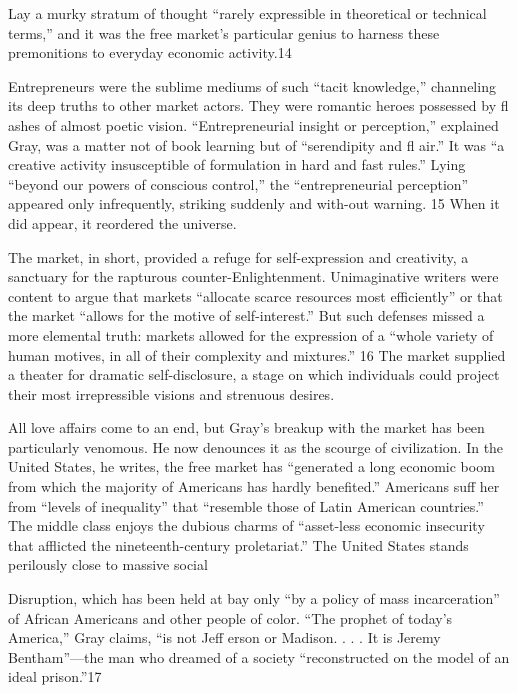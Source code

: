 Lay a murky stratum of thought “rarely expressible in theoretical or technical terms,” and it was the free market’s particular genius to harness these premonitions to everyday economic activity.{\color{blue}14}
 \par 
Entrepreneurs were the sublime mediums of such “tacit knowledge,” channeling its deep truths to other market actors. They were romantic heroes possessed by fl ashes of almost poetic vision. “Entrepreneurial insight or perception,” explained Gray, was a matter not of book learning but of “serendipity and fl air.” It was “a creative activity insusceptible of formulation in hard and fast rules.” Lying “beyond our powers of conscious control,” the “entrepreneurial perception” appeared only infrequently, striking suddenly and with-out warning. {\color{blue}15} When it did appear, it reordered the universe.
 \par 
The market, in short, provided a refuge for self-expression and creativity, a sanctuary for the rapturous counter-Enlightenment. Unimaginative writers were content to argue that markets “allocate scarce resources most efficiently” or that the market “allows for the motive of self-interest.” But such defenses missed a more elemental truth: markets allowed for the expression of a “whole variety of human motives, in all of their complexity and mixtures.” {\color{blue}16} The market supplied a theater for dramatic self-disclosure, a stage on which individuals could project their most irrepressible visions and strenuous desires.
 \par 
All love affairs come to an end, but Gray’s breakup with the market has been particularly venomous. He now denounces it as the scourge of civilization. In the United States, he writes, the free market has “generated a long economic boom from which the majority of Americans has hardly benefited.” Americans suff her from “levels of inequality” that “resemble those of Latin American countries.” The middle class enjoys the dubious charms of “asset-less economic insecurity that afflicted the nineteenth-century proletariat.” The United States stands perilously close to massive social
 \par 
Disruption, which has been held at bay only “by a policy of mass incarceration” of African Americans and other people of color. “The prophet of today’s America,” Gray claims, “is not Jeff erson or Madison. . . . It is Jeremy Bentham”—the man who dreamed of a society “reconstructed on the model of an ideal prison.”{\color{blue}17}
 \par 
